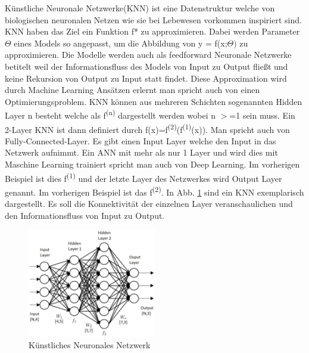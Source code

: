 \documentclass{llncs}
\begin{document}
Künstliche Neuronale Netzwerke(KNN) ist eine Datenstruktur welche von biologischen neuronalen Netzen wie sie bei Lebewesen vorkommen inspiriert sind. KNN haben das Ziel ein Funktion f* zu approximieren. Dabei werden Parameter $\Theta$ eines Models so angepasst, um die Abbildung von y = f(x;$\Theta)$ zu approximieren. Die Modelle werden auch als feedforward Neuronale Netzwerke betitelt weil der Informationsfluss des Models von Input zu Output fließt und keine Rekursion von Output zu Input statt findet. Diese Approximation wird durch Machine Learning Ansätzen erlernt man spricht auch von einen Optimierungsproblem. KNN können aus mehreren Schichten sogenannten Hidden Layer n besteht welche als f\textsuperscript{(n)} dargestellt werden wobei n $>$=1 sein muss. Ein 2-Layer KNN ist dann definiert durch f(x)=f\textsuperscript{(2)}(f\textsuperscript{(1)}(x)). Man spricht auch von Fully-Connected-Layer. Es gibt einen Input Layer welche den Input in das Netzwerk aufnimmt\cite{Grundlagen}. Ein ANN mit mehr als nur 1 Layer und wird dies mit Maschine Learning trainiert spricht man auch von Deep Learning. Im vorherigen Beispiel ist dies f\textsuperscript{(1)} und der letzte Layer des Netzwerkes wird Output Layer genannt. Im vorherigen Beispiel ist das f\textsuperscript{(2)}. In Abb. \ref{fig:KNN} sind ein KNN exemplarisch dargestellt. Es soll die Konnektivität der einzelnen Layer veranschaulichen und den Informationsfluss von Input zu Output. 

\begin{figure}[htbp]
	\centering
	\includegraphics[width=0.5\textwidth]{neuronalesnetzwerk.jpg}
	\caption{Künstliches Neuronales Netzwerk}
	\label{fig:KNN}
\end{figure}
\end{document}
